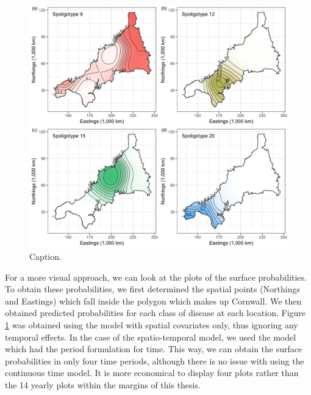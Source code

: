 \documentclass[a4paper,showframe,11pt]{report}\usepackage[]{graphicx}\usepackage[]{color}
\newenvironment{knitrout}{}{} %
\begin{document}
\begin{knitrout}
\color{fgcolor}\begin{figure}[h]

{\centering \includegraphics[width=\linewidth]{figure/plot_btb-1} 

}

\caption[Caption]{Caption.}\label{fig:plot.btb}
\end{figure}


\end{knitrout}

For a more visual approach, we can look at the plots of the surface probabilities.
To obtain these probabilities, we first determined the spatial points (Northings and Eastings) which fall inside the polygon which makes up Cornwall.
We then obtained predicted probabilities for each class of disease at each location.
Figure \ref{fig:plot.btb} was obtained using the model with spatial covariates only, thus ignoring any temporal effects.
In the case of the spatio-temporal model, we used the model which had the period formulation for time.
This way, we can obtain the surface probabilities in only four time periods, although there is no issue with using the continuous time model.
It is more economical to display four plots rather than the 14 yearly plots within the margins of this thesis.
\end{document}
